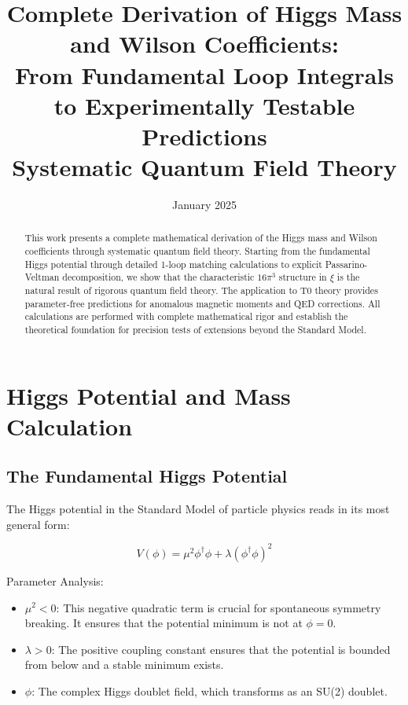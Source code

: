 \documentclass[12pt,a4paper]{report}
\author{}
\date{January 2025}
\begin{document}
	\hfuzz=200pt
	\allowdisplaybreaks
	
	\title{Complete Derivation of Higgs Mass and Wilson Coefficients:\\
		From Fundamental Loop Integrals to Experimentally Testable Predictions\\
		Systematic Quantum Field Theory}
	\maketitle
	
	\begin{abstract}
		This work presents a complete mathematical derivation of the Higgs mass and Wilson coefficients through systematic quantum field theory. Starting from the fundamental Higgs potential through detailed 1-loop matching calculations to explicit Passarino-Veltman decomposition, we show that the characteristic $16\pi^3$ structure in $\xi$ is the natural result of rigorous quantum field theory. The application to T0 theory provides parameter-free predictions for anomalous magnetic moments and QED corrections. All calculations are performed with complete mathematical rigor and establish the theoretical foundation for precision tests of extensions beyond the Standard Model.
	\end{abstract}
	
	\tableofcontents
	
	\section{Higgs Potential and Mass Calculation}
	
	\subsection{The Fundamental Higgs Potential}
	
	The Higgs potential in the Standard Model of particle physics reads in its most general form:
	
	\begin{equation}
		V(\phi) = \mu^2 \phi^\dagger\phi + \lambda(\phi^\dagger\phi)^2
	\end{equation}
	
	\begin{important}
		Parameter Analysis:
		\begin{itemize}
			\item $\mu^2 < 0$: This negative quadratic term is crucial for spontaneous symmetry breaking. It ensures that the potential minimum is not at $\phi = 0$.
			\item $\lambda > 0$: The positive coupling constant ensures that the potential is bounded from below and a stable minimum exists.
			\item $\phi$: The complex Higgs doublet field, which transforms as an SU(2) doublet.
		\end{itemize}
	\end{important}
	
\end{document}
